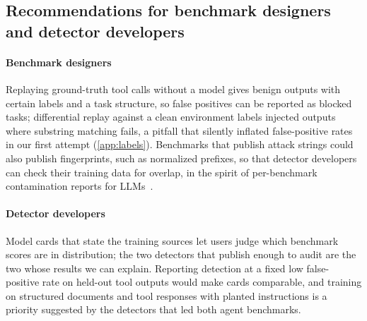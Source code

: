 \subsection{Recommendations for benchmark designers and detector developers}
\label{sec:recommend}

\paragraph{Benchmark designers}
Replaying ground-truth tool calls without a model gives benign outputs with certain labels and a task structure, so false positives can be reported as blocked tasks; differential replay against a clean environment labels injected outputs where substring matching fails, a pitfall that silently inflated false-positive rates in our first attempt (\ref{app:labels}). Benchmarks that publish attack strings could also publish fingerprints, such as normalized prefixes, so that detector developers can check their training data for overlap, in the spirit of per-benchmark contamination reports for LLMs~\cite{sainz2023}.

\paragraph{Detector developers}
Model cards that state the training sources let users judge which benchmark scores are in distribution; the two detectors that publish enough to audit are the two whose results we can explain. Reporting detection at a fixed low false-positive rate on held-out tool outputs would make cards comparable, and training on structured documents and tool responses with planted instructions is a priority suggested by the detectors that led both agent benchmarks.
